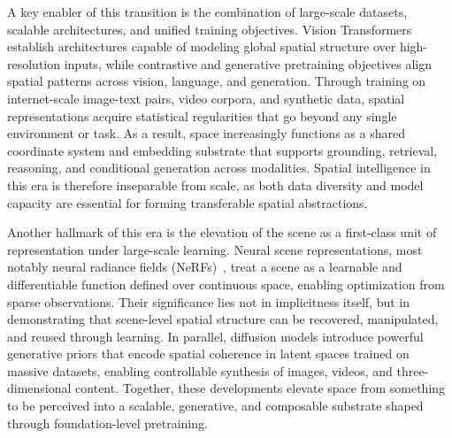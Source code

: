 A key enabler of this transition is the combination of large-scale datasets, scalable architectures, and unified training objectives.
Vision Transformers establish architectures capable of modeling global spatial structure over high-resolution inputs, while contrastive and generative pretraining objectives align spatial patterns across vision, language, and generation.
Through training on internet-scale image-text pairs, video corpora, and synthetic data, spatial representations acquire statistical regularities that go beyond any single environment or task.
As a result, space increasingly functions as a shared coordinate system and embedding substrate that supports grounding, retrieval, reasoning, and conditional generation across modalities.
Spatial intelligence in this era is therefore inseparable from scale, as both data diversity and model capacity are essential for forming transferable spatial abstractions.



Another hallmark of this era is the elevation of the scene as a first-class unit of representation under large-scale learning.
Neural scene representations, most notably neural radiance fields (NeRFs)~\cite{mildenhall2021nerf}, treat a scene as a learnable and differentiable function defined over continuous space, enabling optimization from sparse observations.
Their significance lies not in implicitness itself, but in demonstrating that scene-level spatial structure can be recovered, manipulated, and reused through learning.
In parallel, diffusion models introduce powerful generative priors that encode spatial coherence in latent spaces trained on massive datasets, enabling controllable synthesis of images, videos, and three-dimensional content.
Together, these developments elevate space from something to be perceived into a scalable, generative, and composable substrate shaped through foundation-level pretraining.






